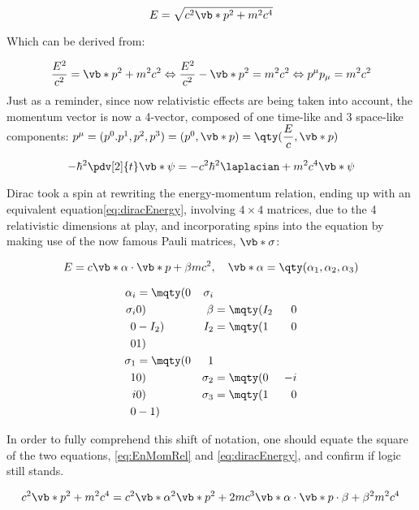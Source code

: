  \begin{equation}
    E=\sqrt{c^2\vb*{p}^2+m^2c^4}
    \label{eq:EnMomRel}
 \end{equation}

Which can be derived from:

 \begin{equation}
    \dfrac{E^2}{c^2}= \vb*{p}^2 +m^2c^2 \Leftrightarrow \dfrac{E^2}{c^2}-\vb*{p}^2=m^2c^2\Leftrightarrow p^\mu p_\mu = m^2c^2
 \end{equation}
 Just as a reminder, since now relativistic effects are being taken into account, the momentum vector is now a 4-vector, composed of one time-like and 3 space-like components: $p^\mu=(p^0.p^1,p^2,p^3)=(p^0,\vb*{p})=\qty(\dfrac{E}{c},\vb*{p})$

 \begin{equation}
    -\hbar^2 \pdv[2]{t} \vb*{\psi}=-c^2\hbar^2\laplacian + m^2c^4\vb*{\psi}
    \label{eq:KG}
\end{equation}

 Dirac took a spin at rewriting the energy-momentum relation, ending up with an equivalent equation\eqref{eq:diracEnergy}, involving $4\times 4$ matrices, due to the 4 relativistic dimensions at play, and incorporating spins into the equation by making use of the now famous Pauli matrices, $\vb*{\sigma}$:

 \begin{equation}
    E=c\vb*{\alpha}\cdot \vb*{p}+{\beta} mc^2,\quad \vb*{\alpha}=\qty(\alpha_1,\alpha_2,\alpha_3)
    \label{eq:diracEnergy}
 \end{equation}

 \begin{align}
    \alpha_i&=\mqty(0 & {\sigma}_i\\ {\sigma}_i&0) & {\beta}&=\mqty(I_2 & 0 \\ 0 &-I_2) &I_2&=\mqty(1&0\\0&1)\\
    \sigma_1&=\mqty(0&1\\1&0) & \sigma_2&=\mqty(0&-i\\i&0)& \sigma_3&=\mqty(1&0\\0&-1)
 \end{align}

 In order to fully comprehend this shift of notation, one should equate the square of the two equations, \eqref{eq:EnMomRel} and \eqref{eq:diracEnergy}, and confirm if logic still stands.

 \begin{equation}
    c^2 \vb*{p}^2 + m^2c^4 = c^2\vb*{\alpha}^2\vb*{p}^2+2 m c^3 \vb*{\alpha}\cdot \vb*{p} \cdot \beta + \beta^2 m^2 c^4
 \end{equation}

